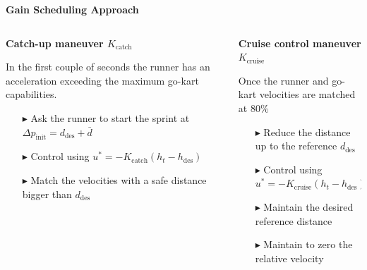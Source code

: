 \documentclass[9pt, aspectratio=169]{beamer}
\begin{document}
\begin{frame}
\vspace{1.0cm}
\centering
{}\textcolor{emph@Thesis}{\textbf{\small{Gain Scheduling Approach}}} 

\begin{columns}
\begin{column}{0.5\textwidth}
\vspace{0.2cm}
\begin{block}{}
\centering
\textbf{Catch-up maneuver $K_\text{catch}$} \\
\end{block}
In the first couple of seconds the runner has an acceleration exceeding the maximum go-kart capabilities.
\begin{itemize}
\vspace{0.1cm}
\footnotesize
	\item[$\blacktriangleright$] Ask the runner to start the sprint at $\Delta p_\text{init} = d_\text{des} + \bar{d}$
	\item[$\blacktriangleright$] Control using $u^* = - K_\text{catch} (h_t - h_{\text{des}}) $
	\item[$\blacktriangleright$] Match the velocities with a safe distance bigger than $d_\text{des}$
\end{itemize}

\end{column}
\begin{column}{0.5\textwidth}
\vspace{0.3cm}
\begin{block}{}
\centering
\textbf{Cruise control maneuver $K_\text{cruise}$} \\
\end{block}
Once the runner and go-kart velocities are matched at 80\%
\begin{itemize}
\vspace{0.1cm}
\footnotesize
	\item[$\blacktriangleright$] Reduce the distance up to the reference $d_\text{des}$
	\item[$\blacktriangleright$] Control using $u^* = - K_\text{cruise} (h_t - h_{\text{des}}) $
	\item[$\blacktriangleright$] Maintain the desired reference distance
	\item[$\blacktriangleright$] Maintain to zero the relative velocity
\end {itemize}
\end{column}
\end{columns}

\end{frame}
\end{document}
